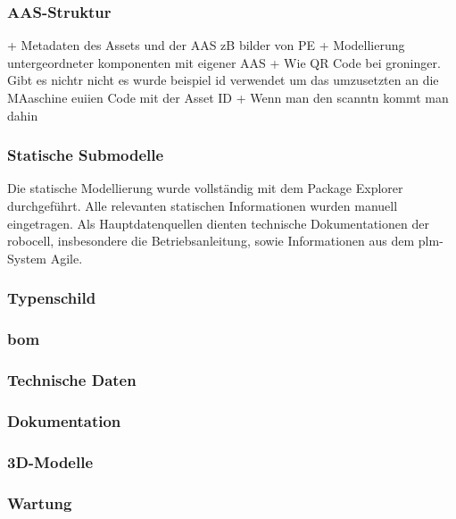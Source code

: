 \subsubsection{AAS-Struktur}

+ Metadaten des Assets und der AAS zB bilder von PE
+ Modellierung untergeordneter komponenten mit eigener AAS
+ Wie QR Code bei groninger. Gibt es nichtr nicht es wurde beispiel id verwendet um das umzusetzten an die MAaschine euiien Code mit der Asset ID
+ Wenn man den scanntn kommt man dahin

\subsubsection{Statische Submodelle}

Die statische Modellierung wurde vollständig mit dem Package Explorer durchgeführt. 
Alle relevanten statischen Informationen wurden manuell eingetragen. 
Als Hauptdatenquellen dienten technische Dokumentationen der robocell, insbesondere die Betriebsanleitung, sowie Informationen aus dem \acs{plm}-System Agile.

\subsubsection*{Typenschild}
\vspace{-0.5em}

\subsubsection*{\acs{bom}}
\vspace{-0.5em}

\subsubsection*{Technische Daten}
\vspace{-0.5em}

\subsubsection*{Dokumentation}
\vspace{-0.5em}

\subsubsection*{3D-Modelle}
\vspace{-0.5em}

\subsubsection*{Wartung}
\vspace{-0.5em}

